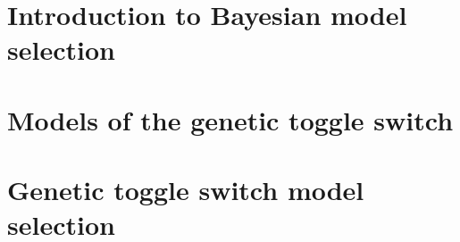 \section{Introduction to Bayesian model selection}

\section{Models of the genetic toggle switch}

\section{Genetic toggle switch model selection}

